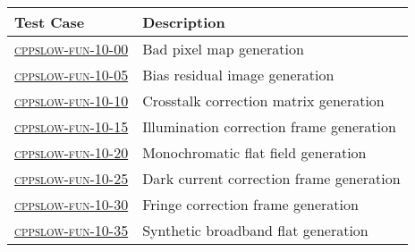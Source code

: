 \begin{longtable} {|p{}|p{}|}\hline
\textbf{Test Case}  & \textbf{Description} \\\hline
\hyperref[cppslow-fun-10-00]{\textsc{cppslow-fun-10-00}} & Bad pixel map generation \\\hline
\hyperref[cppslow-fun-10-05]{\textsc{cppslow-fun-10-05}} & Bias residual image generation \\\hline
\hyperref[cppslow-fun-10-10]{\textsc{cppslow-fun-10-10}} & Crosstalk correction matrix generation \\\hline
\hyperref[cppslow-fun-10-15]{\textsc{cppslow-fun-10-15}} & Illumination correction frame generation \\\hline
\hyperref[cppslow-fun-10-20]{\textsc{cppslow-fun-10-20}} & Monochromatic flat field generation \\\hline
\hyperref[cppslow-fun-10-25]{\textsc{cppslow-fun-10-25}} & Dark current correction frame generation \\\hline
\hyperref[cppslow-fun-10-30]{\textsc{cppslow-fun-10-30}} & Fringe correction frame generation \\\hline
\hyperref[cppslow-fun-10-35]{\textsc{cppslow-fun-10-35}} & Synthetic broadband flat generation \\\hline
\end{longtable}
